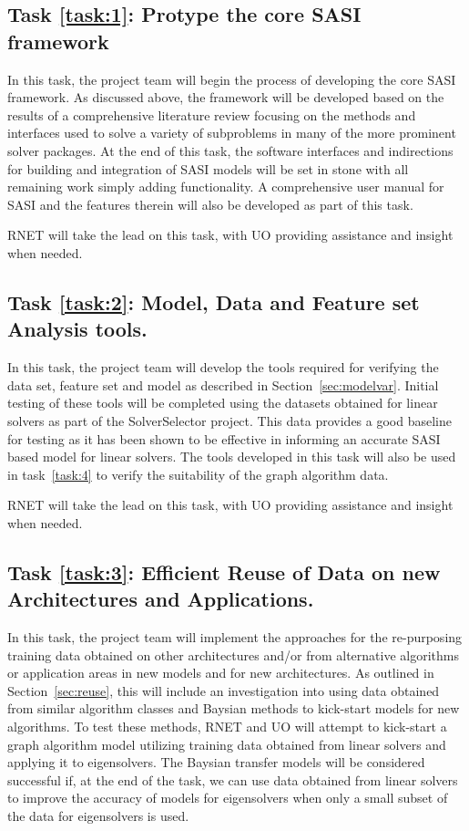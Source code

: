\setcounter{taskCount}{0}

\label{task:1}
\subsection{Task \ref{task:1}: Protype the core SASI framework}
In this task, the project team will begin the process of developing the core SASI framework. As discussed above, the framework
will be developed based on the results of a comprehensive literature review focusing on the methods 
and interfaces used to solve a variety of subproblems in many of the more prominent solver packages.
At the end of this task, the software interfaces and indirections for building and integration of SASI models 
will be set in stone with all remaining work simply adding functionality. A comprehensive user manual for SASI and
the features therein will also be developed as part of this task. 

RNET will take the lead on this task, with UO providing assistance and insight when needed. 

\label{task:2}
\subsection{Task \ref{task:2}: Model, Data and Feature set Analysis tools. }
In this task, the project team will develop the tools required for verifying the data set, feature set and model as described in Section~\ref{sec:modelvar}. Initial testing of these tools will be completed using the datasets obtained for linear solvers as part of the SolverSelector project. This data provides a good baseline for testing as it has been shown to be effective in informing an accurate SASI based model for linear solvers. The tools developed in this task will also be used in task~\ref{task:4} to verify the suitability of the graph algorithm data. 

RNET will take the lead on this task, with UO providing assistance and insight when needed. 


\label{task:3}
\subsection{Task \ref{task:3}: Efficient Reuse of Data on new Architectures and Applications.}
In this task, the project team will implement the approaches for the re-purposing training data obtained on other architectures and/or from alternative algorithms or application areas in new models and for new architectures. As outlined in Section~\ref{sec:reuse}, this will include an investigation into using data obtained from similar algorithm classes and Baysian methods to kick-start models for new algorithms. To test these methods, RNET and UO will attempt to kick-start a graph algorithm model utilizing training data obtained from linear solvers and applying it to eigensolvers. The Baysian transfer models will be considered successful if, at the end of the task, we can use data obtained from linear solvers to improve the accuracy of models for eigensolvers when only a small subset of the data for eigensolvers is used. 

